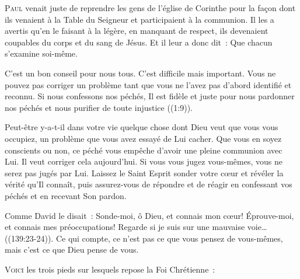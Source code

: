 \lettrine{P}{aul} venait juste de reprendre
 les gens de l'église de  Corinthe
 pour la fa\c{c}on dont ils venaient à la Table du Seigneur
 et participaient à la communion.
 Il les a avertis qu'en le faisant à la légère,
 en manquant de respect, ils devenaient coupables
 du corps et du sang de Jésus.
 Et il leur a donc dit~: 
 \Og Que chacun s'examine soi-même. \Fg{}

C'est un bon conseil pour nous tous. C'est difficile mais important.
 Vous ne pouvez pas corriger un problème tant que vous ne l'avez pas
 d'abord identifié et reconnu.
 \Og Si nous confessons nos péchés, Il est fidèle et juste
 pour nous pardonner nos péchés et nous purifier
 de toute injustice \Fg{} ((1:9)).


Peut-être y-a-t-il dans votre vie quelque chose dont Dieu
 veut que vous vous occupiez, un problème que vous avez essayé
 de Lui cacher.
 Que vous en soyez conscients ou non,
 ce péché vous empêche d'avoir une pleine communion avec Lui.
 Il veut corriger cela aujourd'hui.
 Si vous vous jugez vous-mêmes, vous ne serez pas jugés par Lui.
 Laissez le Saint Esprit sonder votre c\oe{}ur et révéler la vérité
 qu'Il connaît, puis assurez-vous de répondre et de réagir
 en confessant vos péchés et en recevant Son pardon.

Comme David le disait~: 
 \Og Sonde-moi, ô Dieu, et connais mon c\oe{}ur!
 Éprouve-moi, et connais mes préoccupations!
 Regarde si je suis sur une mauvaise voie\dots{} \Fg{}
 ((139:23-24)).
 Ce qui compte, ce n'est pas ce que vous pensez de vous-mêmes,
 mais c'est ce que Dieu pense de vous.

\dvrule







\lettrine[lhang=0.8]{V}{oici} les trois pieds sur lesquels
 repose la Foi Chrétienne~:

